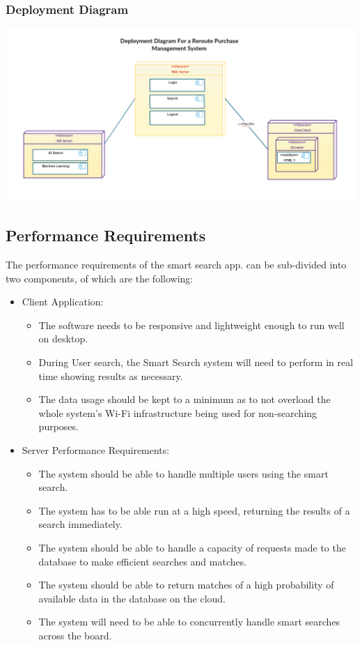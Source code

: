 \documentclass[a4paper,10pt]{article}
\begin{document}
	\subsubsection {Deployment Diagram}
		 \includegraphics[scale=0.62]{Diagrams/Deployment Diagram.png}\\
		
		
	\subsection{Performance Requirements}
	The performance requirements of the smart search app. can be sub-divided into two components, of which are the following:
	\begin{itemize}
	\item Client Application:
		\begin{itemize}
		\item The software needs to be responsive and lightweight enough to run well on desktop.
		\item During User search, the Smart Search system will need to perform in real time showing results as necessary.
		\item The data usage should be kept to a minimum as to not overload the whole system's Wi-Fi infrastructure being used for non-searching purposes.\\
		\end{itemize}

	\item Server Performance Requirements:
		\begin{itemize}
		\item The system should be able to handle multiple users using the smart search.
		\item The system has to be able run at a high speed, returning the results of a search immediately.
		\item The system should be able to handle a capacity of requests made to the database to make efficient searches and matches. 
		\item The system should be able to return matches of a high probability of available data in the database on the cloud.
		\item The system will need to be able to concurrently handle smart searches across the board.
		\end{itemize}
	\end{itemize}
\end{document}
